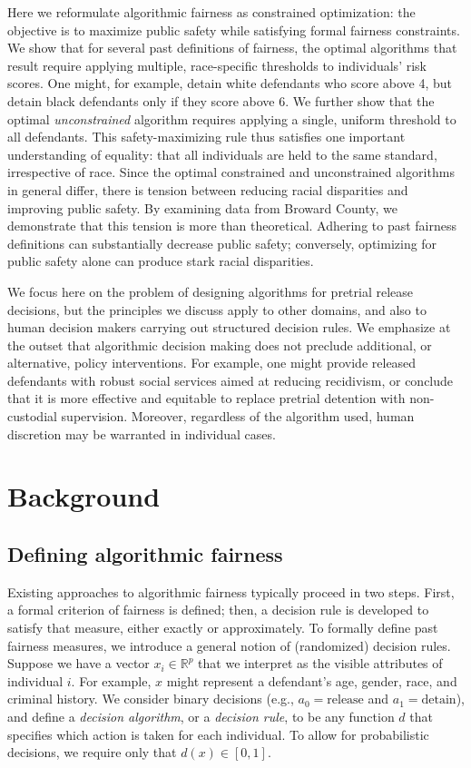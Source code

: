 \documentclass[sigconf]{acmart}
\newcommand{\RR}{\mathbb{R}}
\begin{document}
Here we reformulate algorithmic fairness as constrained optimization:
the objective is to maximize public safety 
while satisfying formal fairness constraints.
We show that for several past definitions of fairness,
the optimal algorithms that result require applying multiple, 
race-specific thresholds to individuals' risk scores.
One might, for example, detain white defendants who score above 4, but detain black defendants only if they score above 6.
We further show that the optimal \emph{unconstrained} algorithm requires applying a single, uniform threshold to all defendants.
This safety-maximizing rule thus satisfies one important understanding of equality: 
that all individuals are held to the same standard, irrespective of race.
Since the optimal constrained and unconstrained algorithms in general differ,
there is tension between reducing racial disparities 
and improving public safety.
By examining data from Broward County,
we demonstrate that this tension is more than theoretical.
Adhering to past fairness definitions can substantially decrease public safety; 
conversely, optimizing for public safety alone can produce stark racial disparities.

We focus here on the problem of designing algorithms for pretrial release decisions, but the principles we discuss apply to other domains, and also to human decision makers carrying out structured decision rules. We emphasize at the outset that algorithmic decision making does not preclude additional, or alternative, policy interventions. For example, one might provide released defendants with robust social services aimed at reducing recidivism, or conclude that it is more effective and equitable to replace pretrial detention with non-custodial supervision.
Moreover, regardless of the algorithm used, human discretion may be warranted in individual cases.

\section{Background}

\subsection{Defining algorithmic fairness}
\label{sec:def-fairness}

Existing approaches to algorithmic fairness typically
proceed in two steps. 
First, a formal criterion of fairness is defined;
then, a decision rule is developed to 
satisfy that measure, either exactly or approximately.
To formally define past fairness measures, we 
introduce a general notion of (randomized) decision rules.
Suppose we have a vector $x_i \in \RR^p$
that we interpret as the visible attributes of individual $i$.
For example, $x$ might represent a defendant's age, gender, race, and criminal history.
We consider binary decisions (e.g., $a_0=\text{release}$ and $a_1=\text{detain}$),
and define a \emph{decision algorithm}, or a \emph{decision rule}, to
be any function $d$ that specifies which action is taken for each individual.
To allow for probabilistic decisions, we require only that $d(x) \in [0,1]$.
\end{document}
